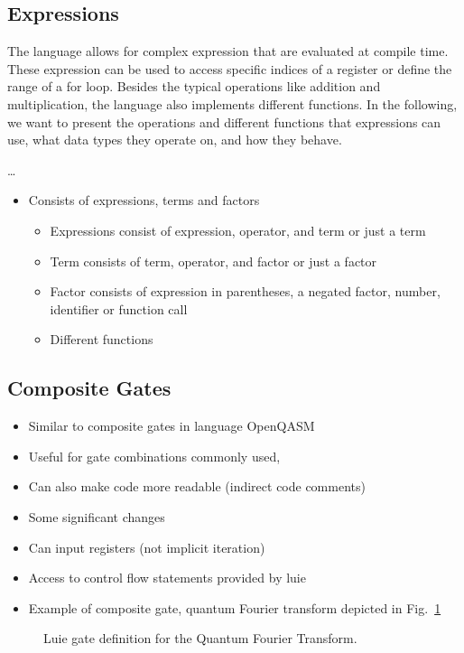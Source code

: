 \subsection{Expressions}
\label{sec:concept_expressions}
The language allows for complex expression that are evaluated at compile time. These expression can be used to access specific indices of a register or define the range of a for loop. Besides the typical operations like addition and multiplication, the language also implements different functions. In the following, we want to present the operations and different functions that expressions can use, what data types they operate on, and how they behave. 

\dots
\begin{itemize}
    \item Consists of expressions, terms and factors
    \begin{itemize}
        \item Expressions consist of expression, operator, and term or just a term
        \item Term consists of term, operator, and factor or just a factor
        \item Factor consists of expression in parentheses, a negated factor, number, identifier or function call
        \item Different functions
    \end{itemize}
\end{itemize}

\subsection{Composite Gates}
\label{sec:concept_compositeGates}
\begin{itemize}
    \item Similar to composite gates in language OpenQASM
    \item Useful for gate combinations commonly used,
    \item Can also make code more readable (indirect code comments)
    \item Some significant changes
    \item Can input registers (not implicit iteration)
    \item Access to control flow statements provided by luie
    \item Example of composite gate, quantum Fourier transform depicted in Fig.~\ref{fig:qft_example}
\end{itemize}

\begin{figure}[htp]
    \centering     
    
    \caption{Luie gate definition for the Quantum Fourier Transform.}
    \label{fig:qft_example}
\end{figure}